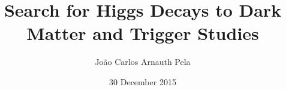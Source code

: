 \documentclass{thesis}
\title{\LARGE Search for Higgs Decays to Dark Matter and Trigger Studies}
\author{João Carlos Arnauth Pela}
\date{30 December 2015}
\begin{document}
\begin{frontmatter}
\end{frontmatter}

\begin{mainmatter}
                      
\end{mainmatter}

\begin{backmatter}
  
\end{backmatter}
\end{document}
